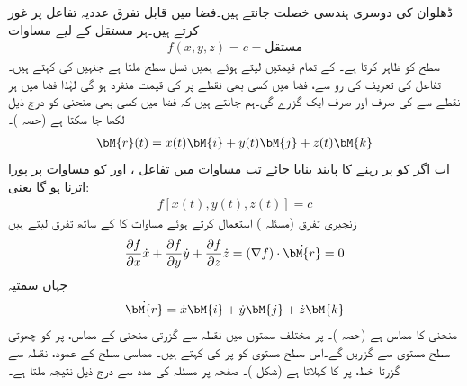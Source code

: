 ڈھلوان کی دوسری ہندسی خصلت جانتے ہیں۔فضا میں قابل تفرق عددیہ تفاعل  پر غور کرتے ہیں۔ہر مستقل  کے لیے مساوات
\begin{align}\label{مساوات_الاحصاء_سمتی_تفرق_چ}
f(x,y,z)=c=\text{مستقل}
\end{align}
 سطح  کو ظاہر کرتا ہے۔ کے تمام قیمتیں لیتے ہوئے ہمیں نسل سطح ملتا ہے جنہیں  کی  کہتے ہیں۔ تفاعل کی تعریف کی رو سے، فضا میں کسی بھی نقطے پر   کی قیمت منفرد ہو گی لہٰذا فضا میں ہر نقطے سے  کی صرف اور صرف ایک  گزرے گی۔ہم جانتے ہیں کہ فضا میں کسی بھی منحنی  کو درج ذیل لکھا جا سکتا ہے (حصہ )۔
\begin{align}\label{مساوات_الاحصاء_سمتی_تفرق_ح}
\bM{r}(t)=x(t)\bM{i}+y(t)\bM{j}+z(t)\bM{k}
\end{align}
اب اگر  کو  پر رہنے کا پابند بنایا جائے تب مساوات  میں تفاعل ،  اور  کو مساوات  پر پورا اترنا ہو گا یعنی:
\begin{align}\label{مساوات_الاحصاء_سمتی_تفرق_خ}
f[x(t),y(t),z(t)]=c
\end{align}
زنجیری تفرق  (مسئلہ ) استعمال کرتے ہوئے مساوات  کا  کے ساتھ تفرق لیتے ہیں
\begin{align}\label{مساوات_الاحصاء_سمتی_تفرق_د}
\frac{\partial f}{\partial x}\dot{x}+\frac{\partial f}{\partial y}\dot{y}+\frac{\partial f}{\partial z}\dot{z}=(\nabla f)\cdot \dot{\bM{r}}=0
\end{align}
جہاں سمتیہ
\begin{align*}
\dot{\bM{r}}=\dot{x}\bM{i}+\dot{y}\bM{j}+\dot{z}\bM{k}
\end{align*}
منحنی  کا مماس ہے (حصہ )۔  پر مختلف سمتوں میں نقطہ  سے  گزرتی منحنی کے مماس،  پر  کو چھوتی سطح مستوی سے گزریں گے۔اس سطح مستوی کو  پر  کی  کہتے ہیں۔ مماسی سطح کے عمود، نقطہ  سے گزرتا خط،  پر  کا  کہلاتا ہے (شکل )۔ صفحہ  پر مسئلہ  کی مدد سے درج ذیل نتیجہ ملتا ہے۔
